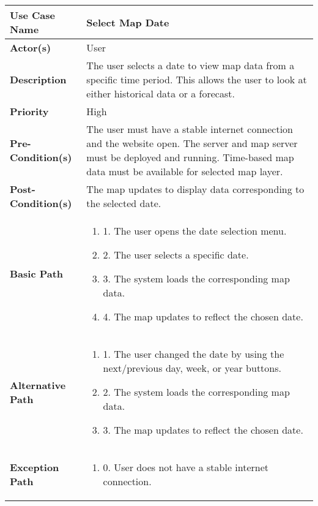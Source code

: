 \begin{table}[h]
    \centering
    \renewcommand{\arraystretch}{1.5}
    \begin{tabularx}{\textwidth}{|l|X|}
        \hline
        \rowcolor{gray!20}
        \textbf{Use Case Name} & Select Map Date \\
        \hline
        \textbf{Actor(s)} & User \\
        \hline
        \textbf{Description} & The user selects a date to view map data from a specific time period. This allows the user to look at either historical data or a forecast. \\
        \hline
        \textbf{Priority} & High \\
        \hline
        \textbf{Pre-Condition(s)} & The user must have a stable internet connection and the website open. The server and map server must be deployed and running. Time-based map data must be available for selected map layer. \\
        \hline
        \textbf{Post-Condition(s)} & The map updates to display data corresponding to the selected date. \\
        \hline
        \textbf{Basic Path} &  
        \begin{enumerate}[label=,left=0pt]
            \item 1. The user opens the date selection menu.
            \item 2. The user selects a specific date.
            \item 3. The system loads the corresponding map data.
            \item 4. The map updates to reflect the chosen date.
        \end{enumerate} \\
        \hline
        \textbf{Alternative Path} & 
        \begin{enumerate}[label=,left=0pt]
            \item 1. The user changed the date by using the next/previous day, week, or year buttons.
            \item 2. The system loads the corresponding map data.
            \item 3. The map updates to reflect the chosen date.
        \end{enumerate} \\
        \hline
        \textbf{Exception Path} & 
        \begin{enumerate}[label=,left=0pt]
            \item 0. User does not have a stable internet connection.

\end{enumerate}
\end{tabularx}
\end{table}
